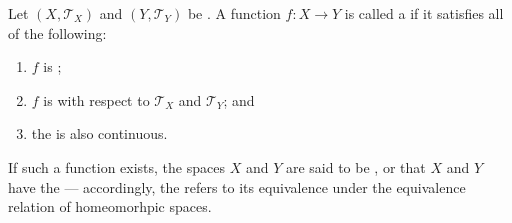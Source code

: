 \begin{definition} \label{definition:homeomorphism_of_topological_spaces}
Let $(X,\mathcal{T}_X)$ and $(Y,\mathcal{T}_Y)$ be . A function $f : X \to Y$ is called a  if it satisfies all of the following:
\begin{enumerate}
  \item $f$ is ;
  \item $f$ is  with respect to $\mathcal{T}_X$ and $\mathcal{T}_Y$; and
  \item the  is also continuous.
\end{enumerate}
If such a function exists, the spaces $X$ and $Y$ are said to be , or that $X$ and $Y$ have the  --- accordingly, the  refers to its equivalence under the equivalence relation of homeomorhpic spaces. 
\end{definition}